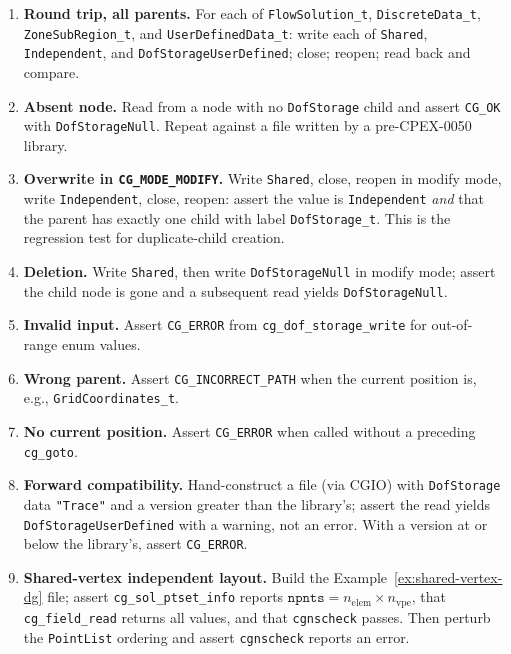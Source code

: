 \documentclass[11pt,letterpaper]{article}
\begin{document}
\begin{enumerate}[leftmargin=2em]
\item \textbf{Round trip, all parents.}  For each of
  \texttt{FlowSolution\_t}, \texttt{DiscreteData\_t},
  \texttt{ZoneSubRegion\_t}, and \texttt{UserDefinedData\_t}: write
  each of \texttt{Shared}, \texttt{Independent}, and
  \texttt{DofStorageUserDefined}; close; reopen; read back and compare.

\item \textbf{Absent node.}  Read from a node with no
  \texttt{DofStorage} child and assert \texttt{CG\_OK} with
  \texttt{DofStorageNull}.  Repeat against a file written by a
  pre-CPEX-0050 library.

\item \textbf{Overwrite in \texttt{CG\_MODE\_MODIFY}.}  Write
  \texttt{Shared}, close, reopen in modify mode, write
  \texttt{Independent}, close, reopen: assert the value is
  \texttt{Independent} \emph{and} that the parent has exactly one
  child with label \texttt{DofStorage\_t}.  This is the regression
  test for duplicate-child creation.

\item \textbf{Deletion.}  Write \texttt{Shared}, then write
  \texttt{DofStorageNull} in modify mode; assert the child node is
  gone and a subsequent read yields \texttt{DofStorageNull}.

\item \textbf{Invalid input.}  Assert \texttt{CG\_ERROR} from
  \texttt{cg\_dof\_storage\_write} for out-of-range enum values.

\item \textbf{Wrong parent.}  Assert \texttt{CG\_INCORRECT\_PATH} when
  the current position is, e.g., \texttt{GridCoordinates\_t}.

\item \textbf{No current position.}  Assert \texttt{CG\_ERROR} when
  called without a preceding \texttt{cg\_goto}.

\item \textbf{Forward compatibility.}  Hand-construct a file
  (via CGIO) with \texttt{DofStorage} data \texttt{"Trace"} and a
  version greater than the library's; assert the read yields
  \texttt{DofStorageUserDefined} with a warning, not an error.  With a
  version at or below the library's, assert \texttt{CG\_ERROR}.

\item \textbf{Shared-vertex independent layout.}  Build the
  Example~\ref{ex:shared-vertex-dg} file; assert
  \texttt{cg\_sol\_ptset\_info} reports
  $\texttt{npnts} = n_{\mathrm{elem}} \times n_{\mathrm{vpe}}$, that
  \texttt{cg\_field\_read} returns all values, and that
  \texttt{cgnscheck} passes.  Then perturb the \texttt{PointList}
  ordering and assert \texttt{cgnscheck} reports an error.


\end{enumerate}
\end{document}
